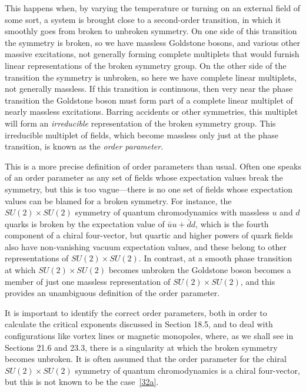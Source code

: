 This happens when, by varying the temperature or turning on an external field of some sort, a system is brought close to a second-order transition, in which it smoothly goes from broken to unbroken symmetry. On one side of this transition the symmetry is broken, so we have massless Goldstone bosons, and various other massive excitations, not generally forming complete multiplets that would furnish linear representations of the broken symmetry group. On the other side of the transition the symmetry is unbroken, so here we have complete linear multiplets, not generally massless. If this transition is continuous, then very near the phase transition the Goldstone boson must form part of a complete linear multiplet of nearly massless excitations. Barring accidents or other symmetries, this multiplet will form an \emph{irreducible} representation of the broken symmetry group. This irreducible multiplet of fields, which become massless only just at the phase transition, is known as the \emph{order parameter}.

This is a more precise definition of order parameters than usual. Often one speaks of an order parameter as any set of fields whose expectation values break the symmetry, but this is too vague---there is no one set of fields whose expectation values can be blamed for a broken symmetry. For instance, the $SU(2)\times SU(2)$ symmetry of quantum chromodynamics with massless $u$ and $d$ quarks is broken by the expectation value of $\bar uu+\bar dd$, which is the fourth component of a chiral four-vector, but quartic and higher powers of quark fields also have non-vanishing vacuum expectation values, and these belong to other representations of $SU(2)\times SU(2)$. In contrast, at a smooth phase transition at which $SU(2)\times SU(2)$ becomes unbroken the Goldstone boson becomes a member of just one massless representation of $SU(2)\times SU(2)$, and this provides an unambiguous definition of the order parameter.

It is important to identify the correct order parameters, both in order to calculate the critical exponents discussed in Section 18.5, and to deal with configurations like vortex lines or magnetic monopoles, where, as we shall see in Sections 21.6 and 23.3, there is a singularity at which the broken symmetry becomes unbroken. It is often assumed that the order parameter for the chiral $SU(2)\times SU(2)$ symmetry of quantum chromodynamics is a chiral four-vector, but this is not known to be the case~\hyperref[ch19-ref-32a]{[32a]}.
